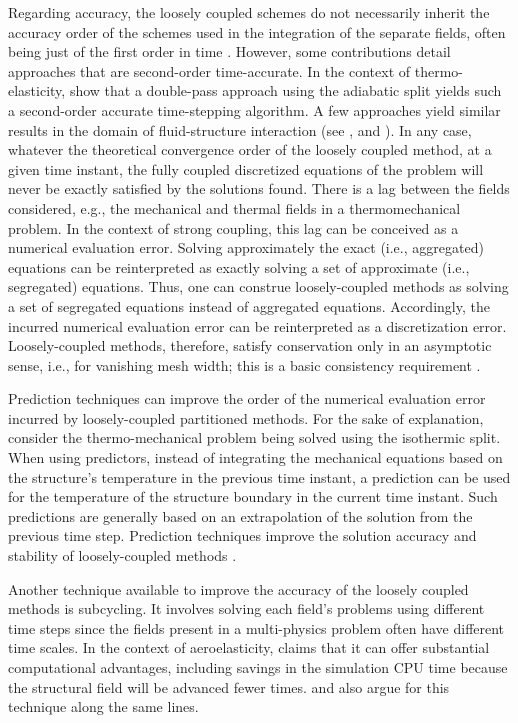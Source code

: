 Regarding accuracy, the loosely coupled schemes do not necessarily inherit the accuracy order of the schemes used in the integration of the separate fields, often being just of the first order in time \citep{farhat_provably_2006}.
However, some contributions detail approaches that are second-order time-accurate.
In the context of thermo-elasticity, \cite{armero_new_1992} show that a double-pass approach using the adiabatic split yields such a second-order accurate time-stepping algorithm.
A few approaches yield similar results in the domain of fluid-structure interaction (see \cite{piperno_explicitimplicit_1997}, \cite{farhat_provably_2006} and \cite{farhat_robust_2010}).
In any case, whatever the theoretical convergence order of the loosely coupled method, at a given time instant, the fully coupled discretized equations of the problem will never be exactly satisfied by the solutions found.
There is a lag between the fields considered, e.g., the mechanical and thermal fields in a thermomechanical problem.
In the context of strong coupling, this lag can be conceived as a numerical evaluation error.
Solving approximately the exact (i.e., aggregated) equations can be reinterpreted as exactly solving a set of approximate (i.e., segregated) equations.
Thus, one can construe loosely-coupled methods as solving a set of segregated equations instead of aggregated equations.
Accordingly, the incurred numerical evaluation error can be reinterpreted as a discretization error.
Loosely-coupled methods, therefore, satisfy conservation only in an asymptotic sense, i.e., for vanishing mesh width; this is a basic consistency requirement \citep{michler_efficient_2005}.

Prediction techniques can improve the order of the numerical evaluation error incurred by loosely-coupled partitioned methods.
For the sake of explanation, consider the thermo-mechanical problem being solved using the isothermic split.
When using predictors, instead of integrating the mechanical equations based on the structure's temperature in the previous time instant, a prediction can be used for the temperature of the structure boundary in the current time instant.
Such predictions are generally based on an extrapolation of the solution from the previous time step.
Prediction techniques improve the solution accuracy and stability of loosely-coupled methods \citep{piperno_explicitimplicit_1997, piperno_partitioned_2001, michler_efficient_2005, farhat_provably_2006}.

Another technique available to improve the accuracy of the loosely coupled methods is subcycling.
It involves solving each field's problems using different time steps since the fields present in a multi-physics problem often have different time scales.
In the context of aeroelasticity, \cite{piperno_partitioned_1995} claims that it can offer substantial computational advantages, including savings in the simulation CPU time because the structural field will be advanced fewer times.
\cite{farhat_high_1997} and \cite{piperno_explicitimplicit_1997} also argue for this technique along the same lines.

